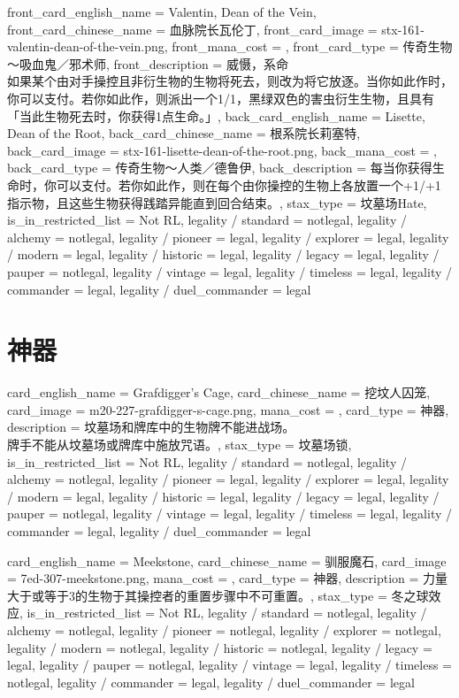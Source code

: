 \documentclass[lang = cn, color = black, 10pt]{AllThatStax}
\begin{document}
\mfcard
{
	front_card_english_name = {Valentin, Dean of the Vein},
	front_card_chinese_name = {血脉院长瓦伦丁},
	front_card_image = stx-161-valentin-dean-of-the-vein.png,
	front_mana_cost = ,
	front_card_type = 传奇生物～吸血鬼／邪术师,
	front_description = {威慑，系命\\
如果某个由对手操控且非衍生物的生物将死去，则改为将它放逐。当你如此作时，你可以支付。若你如此作，则派出一个1/1，黑绿双色的害虫衍生生物，且具有「当此生物死去时，你获得1点生命。」},
	back_card_english_name = {Lisette, Dean of the Root},
	back_card_chinese_name = {根系院长莉塞特},
	back_card_image = stx-161-lisette-dean-of-the-root.png,
	back_mana_cost = ,
	back_card_type = 传奇生物～人类／德鲁伊,
	back_description = {每当你获得生命时，你可以支付。若你如此作，则在每个由你操控的生物上各放置一个+1/+1指示物，且这些生物获得践踏异能直到回合结束。},
	stax_type = 坟墓场Hate,
	is_in_restricted_list = Not RL,
	legality / standard = notlegal,
	legality / alchemy = notlegal,
	legality / pioneer = legal,
	legality / explorer = legal,
	legality / modern = legal,
	legality / historic = legal,
	legality / legacy = legal,
	legality / pauper = notlegal,
	legality / vintage = legal,
	legality / timeless = legal,
	legality / commander = legal,
	legality / duel_commander = legal
}

\section{神器}

\card
{
	card_english_name = {Grafdigger's Cage},
	card_chinese_name = {挖坟人囚笼},
	card_image = m20-227-grafdigger-s-cage.png,
	mana_cost = ,
	card_type = 神器,
	description = {坟墓场和牌库中的生物牌不能进战场。\\
牌手不能从坟墓场或牌库中施放咒语。},
	stax_type = 坟墓场锁,
	is_in_restricted_list = Not RL,
	legality / standard = notlegal,
	legality / alchemy = notlegal,
	legality / pioneer = legal,
	legality / explorer = legal,
	legality / modern = legal,
	legality / historic = legal,
	legality / legacy = legal,
	legality / pauper = notlegal,
	legality / vintage = legal,
	legality / timeless = legal,
	legality / commander = legal,
	legality / duel_commander = legal
}

\card
{
	card_english_name = {Meekstone},
	card_chinese_name = {驯服魔石},
	card_image = 7ed-307-meekstone.png,
	mana_cost = ,
	card_type = 神器,
	description = {力量大于或等于3的生物于其操控者的重置步骤中不可重置。},
	stax_type = 冬之球效应,
	is_in_restricted_list = Not RL,
	legality / standard = notlegal,
	legality / alchemy = notlegal,
	legality / pioneer = notlegal,
	legality / explorer = notlegal,
	legality / modern = notlegal,
	legality / historic = notlegal,
	legality / legacy = legal,
	legality / pauper = notlegal,
	legality / vintage = legal,
	legality / timeless = notlegal,
	legality / commander = legal,
	legality / duel_commander = legal
}
\end{document}
